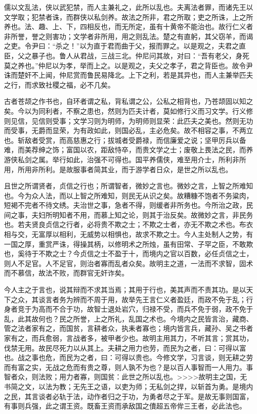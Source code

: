 \documentclass[]{article}
\begin{document}
儒以文乱法，侠以武犯禁，而人主兼礼之，此所以乱也。夫离法者罪，而诸先王以文学取；犯禁者诛，而群侠以私剑养。故法之所非，君之所取；吏之所诛，上之所养也。法、趣、上、下，四相反也，而无所定，虽有十黄帝不能治也。故行仁义者非所誉，誉之则害功；文学者非所用，用之则乱法。楚之有直躬，其父窃羊，而谒之吏。令尹曰：``杀之！''以为直于君而曲于父，报而罪之。以是观之，夫君之直臣，父之暴子也。鲁人从君战，三战三北。仲尼问其故，对曰：``吾有老父，身死莫之养也。''仲尼以为孝，举而上之。以是观之，夫父之孝子，君之背臣也。故令尹诛而楚奸不上闻，仲尼赏而鲁民易降北。上下之利，若是其异也，而人主兼举匹夫之行，而求致社稷之福，必不几矣。

古者苍颉之作书也，自环者谓之私，背私谓之公，公私之相背也，乃苍颉固以知之矣。今以为同利者，不察之患也，然则为匹夫计者，莫如修行义而习文学。行义修则见信，见信则受事；文学习则为明师，为明师则显荣：此匹夫之美也。然则无功而受事，无爵而显荣，为有政如此，则国必乱，主必危矣。故不相容之事，不两立也。斩敌者受赏，而高慈惠之行；拔城者受爵禄，而信廉爱之说；坚甲厉兵以备难，而美荐绅之饰；富国以农，距敌恃卒，而贵文学之士；废敬上畏法之民，而养游侠私剑之属。举行如此，治强不可得也。国平养儒侠，难至用介士，所利非所用，所用非所利。是故服事者简其业，而于游学者日众，是世之所以乱也。

且世之所谓贤者，贞信之行也；所谓智者，微妙之言也。微妙之言，上智之所难知也。今为众人法，而以上智之所难知，则民无从识之矣。故糟糠不饱者不务粱肉，短褐不完者不待文绣。夫治世之事，急者不得，则缓者非所务也。今所治之政，民间之事，夫妇所明知者不用，而慕上知之论，则其于治反矣。故微妙之言，非民务也。若夫贤良贞信之行者，必将贵不欺之士；不欺之士者，亦无不欺之术也。布衣相与交，无富厚以相利，无威势以相惧也，故求不欺之士。今人主处制人之势，有一国之厚，重赏严诛，得操其柄，以修明术之所烛，虽有田常、子罕之臣，不敢欺也，奚待于不欺之士？今贞信之士不盈于十，而境内之官以百数，必任贞信之士，则人不足官。人不足官，则治者寡而乱者众矣。故明主之道，一法而不求智，固术而不慕信，故法不败，而群官无奸诈矣。

今人主之于言也，说其辩而不求其当焉；其用于行也，美其声而不责其功。是以天下之众，其谈言者务为辨而不周于用，故举先王言仁义者盈廷，而政不免于乱；行身者竞于为高而不合于功，故智士退处岩穴，归禄不受，而兵不免于弱，政不免于乱，此其故何也？民之所誉，上之所礼，乱国之术也。今境内之民皆言治，藏商、管之法者家有之，而国贫，言耕者众，执耒者寡也；境内皆言兵，藏孙、吴之书者家有之，而兵愈弱，言战者多，被甲者少也。故明主用其力，不听其言；赏其功，伐禁无用。故民尽死力以从其上。夫耕之用力也劳，而民为之者，曰：可得以富也。战之事也危，而民为之者，曰：可得以贵也。今修文学，习言谈，则无耕之劳而有富之实，无战之危而有贵之尊，则人孰不为也？是以百人事智而一人用力。事智者众，则法败；用力者寡，则国贫：此世之所以乱也。\textgreater{}\textgreater{}\textgreater{}\textgreater{}故明主之国，无书简之文，以法为教；无先王之语，以吏为师；无私剑之捍，以斩首为勇。是境内之民，其言谈者必轨于法，动作者归之于功，为勇者尽之于军。是故无事则国富，有事则兵强，此之谓王资。既畜王资而承敌国之儥超五帝侔三王者，必此法也。
\end{document}

